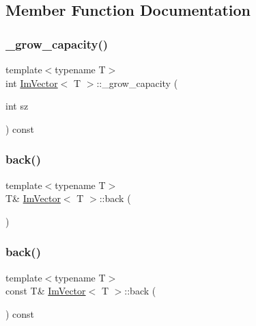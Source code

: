 \subsection{Member Function Documentation}
\mbox{\label{structImVector_a3a097635d464b1b70dc7d59996a88b28}} 
\subsubsection{\texorpdfstring{\+\_\+grow\+\_\+capacity()}{\_grow\_capacity()}}
{\footnotesize\ttfamily template$<$typename T$>$ \\
int \hyperlink{structImVector}{Im\+Vector}$<$ T $>$\+::\+\_\+grow\+\_\+capacity (\begin{DoxyParamCaption}\item[{int}]{sz }\end{DoxyParamCaption}) const\hspace{0.3cm}{\ttfamily [inline]}}

\mbox{\label{structImVector_a6da15f3c402099ed57078835ab942f8e}} 
\subsubsection{\texorpdfstring{back()}{back()}\hspace{0.1cm}{\footnotesize\ttfamily [1/2]}}
{\footnotesize\ttfamily template$<$typename T$>$ \\
T\& \hyperlink{structImVector}{Im\+Vector}$<$ T $>$\+::back (\begin{DoxyParamCaption}{ }\end{DoxyParamCaption})\hspace{0.3cm}{\ttfamily [inline]}}

\mbox{\label{structImVector_a480aba1c78064ca5370249b38a5ae207}} 
\subsubsection{\texorpdfstring{back()}{back()}\hspace{0.1cm}{\footnotesize\ttfamily [2/2]}}
{\footnotesize\ttfamily template$<$typename T$>$ \\
const T\& \hyperlink{structImVector}{Im\+Vector}$<$ T $>$\+::back (\begin{DoxyParamCaption}{ }\end{DoxyParamCaption}) const\hspace{0.3cm}{\ttfamily [inline]}}

